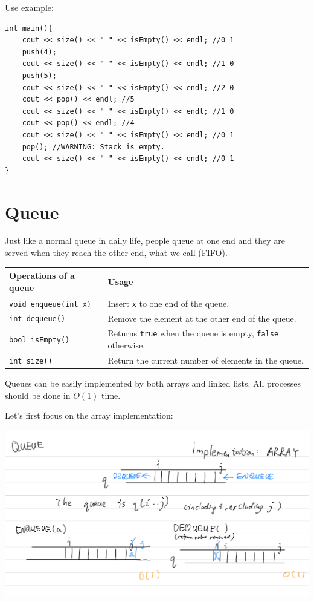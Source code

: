 Use example:
\begin{lstlisting}
int main(){
    cout << size() << " " << isEmpty() << endl; //0 1
    push(4);
    cout << size() << " " << isEmpty() << endl; //1 0
    push(5);
    cout << size() << " " << isEmpty() << endl; //2 0
    cout << pop() << endl; //5
    cout << size() << " " << isEmpty() << endl; //1 0
    cout << pop() << endl; //4
    cout << size() << " " << isEmpty() << endl; //0 1
    pop(); //WARNING: Stack is empty.
    cout << size() << " " << isEmpty() << endl; //0 1
} 
\end{lstlisting}
\section{Queue}
Just like a normal queue in daily life, people queue at one end and they are served when they reach the other end, what we call  (FIFO).

\begin{table}[h]
    \centering
    \begin{tabular}{|m{11em}|m{24em}|}
        \hline
        \textbf{Operations of a queue} & 
        Usage
        \\ \hline \hline
        
        \texttt{void enqueue(int x)} &
        Insert \texttt{x} to one end of the queue.
        \\ \hline
        
        \texttt{int dequeue()} &
        Remove the element at the other end of the queue.
        \\ \hline
        
        \texttt{bool isEmpty()} &
        Returns \texttt{true} when the queue is empty, \texttt{false} otherwise.
        \\ \hline
        
        \texttt{int size()} &
        Return the current number of elements in the queue.
        \\ \hline
    \end{tabular}
\end{table}

Queues can be easily implemented by both arrays and linked lists. All processes should be done in $O(1)$ time.

Let's first focus on the array implementation:

\includegraphics[width=14cm]{images/ch6-qarray.png}

